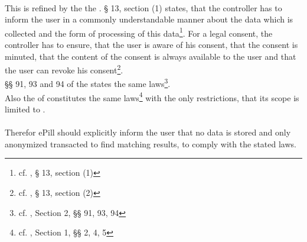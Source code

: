 \\
This is refined by the the \TMGns. § 13, section (1) states, that the controller has to inform the user in a commonly understandable manner about the data which is collected and the form of processing of this data\footnote{cf. \cite{BundesregierungderBundesrepublikDeutschland.01.03.2007}, § 13, section (1)}. For a legal consent, the controller has to ensure, that the user is aware of his consent, that the consent is minuted, that the content of the consent is always available to the user and that the user can revoke his consent\footnote{cf. \cite{BundesregierungderBundesrepublikDeutschland.01.03.2007}, § 13, section (2)}.
\\
§§ 91, 93 and 94 of the \TKG states the same laws\footnote{cf. \cite{BundesregierungderBundesrepublikDeutschland.01.08.1996}, Section 2, §§ 91, 93, 94}.
\\
Also the \DPA of \NRW constitutes the same laws\footnote{cf. \cite{DerInnenministerdesLandesNordrheinWestfalen.09.06.2000}, Section 1, §§ 2, 4, 5} with the only restrictions, that its scope is limited to \NRWns.
\\
\\
Therefor ePill should explicitly inform the user that no data is stored and only anonymized transacted to find matching results, to comply with the stated laws.

